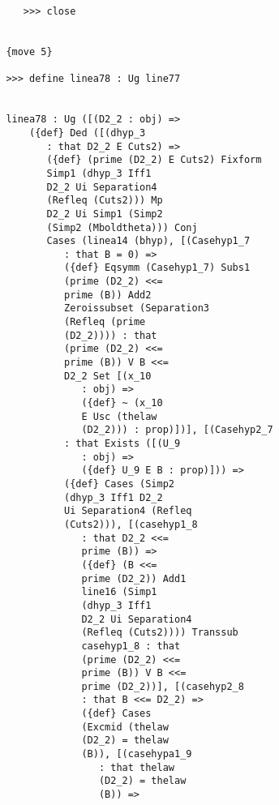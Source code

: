 \documentclass[12pt]{article}
\begin{document}
\begin{verbatim}
                  >>> close


               {move 5}

               >>> define linea78 : Ug line77


               linea78 : Ug ([(D2_2 : obj) => 
                   ({def} Ded ([(dhyp_3 
                      : that D2_2 E Cuts2) => 
                      ({def} (prime (D2_2) E Cuts2) Fixform 
                      Simp1 (dhyp_3 Iff1 
                      D2_2 Ui Separation4 
                      (Refleq (Cuts2))) Mp 
                      D2_2 Ui Simp1 (Simp2 
                      (Simp2 (Mboldtheta))) Conj 
                      Cases (linea14 (bhyp), [(Casehyp1_7 
                         : that B = 0) => 
                         ({def} Eqsymm (Casehyp1_7) Subs1 
                         (prime (D2_2) <<= 
                         prime (B)) Add2 
                         Zeroissubset (Separation3 
                         (Refleq (prime 
                         (D2_2)))) : that 
                         (prime (D2_2) <<= 
                         prime (B)) V B <<= 
                         D2_2 Set [(x_10 
                            : obj) => 
                            ({def} ~ (x_10 
                            E Usc (thelaw 
                            (D2_2))) : prop)])], [(Casehyp2_7 
                         : that Exists ([(U_9 
                            : obj) => 
                            ({def} U_9 E B : prop)])) => 
                         ({def} Cases (Simp2 
                         (dhyp_3 Iff1 D2_2 
                         Ui Separation4 (Refleq 
                         (Cuts2))), [(casehyp1_8 
                            : that D2_2 <<= 
                            prime (B)) => 
                            ({def} (B <<= 
                            prime (D2_2)) Add1 
                            line16 (Simp1 
                            (dhyp_3 Iff1 
                            D2_2 Ui Separation4 
                            (Refleq (Cuts2)))) Transsub 
                            casehyp1_8 : that 
                            (prime (D2_2) <<= 
                            prime (B)) V B <<= 
                            prime (D2_2))], [(casehyp2_8 
                            : that B <<= D2_2) => 
                            ({def} Cases 
                            (Excmid (thelaw 
                            (D2_2) = thelaw 
                            (B)), [(casehypa1_9 
                               : that thelaw 
                               (D2_2) = thelaw 
                               (B)) => 

\end{verbatim}
\end{document}
